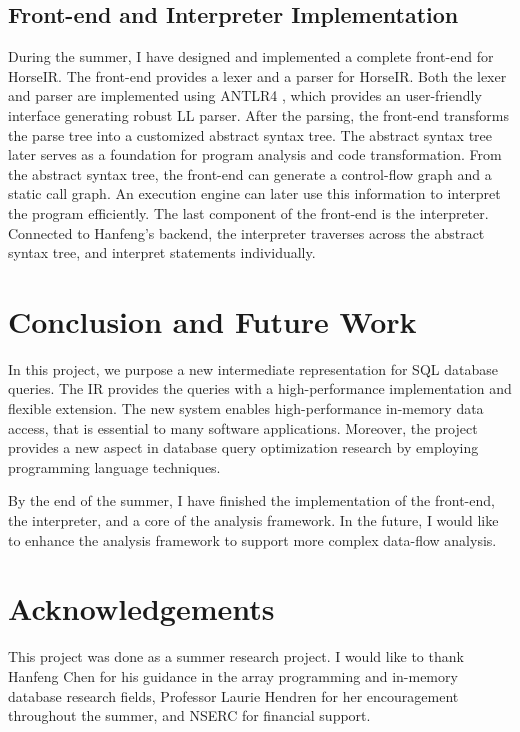 \documentclass[sigplan]{acmart}
\begin{document}
\subsection*{Front-end and Interpreter Implementation}
During the summer, I have designed and implemented a complete front-end for
HorseIR. The front-end provides a lexer and a parser for HorseIR. Both the
lexer and parser are implemented using ANTLR4\cite{ANTLRHome} , which provides
an user-friendly interface generating robust LL parser. After the parsing, the
front-end transforms the parse tree into a customized abstract syntax tree.
The abstract syntax tree later serves as a foundation for program analysis and
code transformation. From the abstract syntax tree, the front-end can generate
a control-flow graph and a static call graph. An execution engine can later
use this information to interpret the program efficiently. The last component
of the front-end is the interpreter. Connected to Hanfeng's backend, the
interpreter traverses across the abstract syntax tree, and interpret statements
individually.

\section{Conclusion and Future Work}

In this project, we purpose a new intermediate representation for SQL database
queries. The IR provides the queries with a high-performance implementation
and flexible extension. The new system enables high-performance in-memory data
access, that is essential to many software applications. Moreover, the project
provides a new aspect in database query optimization research by employing
programming language techniques. 

By the end of the summer, I have finished the implementation of the front-end,
the interpreter, and a core of the analysis framework. In the future, I would
like to enhance the analysis framework to support more complex data-flow
analysis. 

\section*{Acknowledgements}
This project was done as a summer research project. I would like to
thank Hanfeng Chen for his guidance in the array programming and in-memory
database research fields, Professor Laurie Hendren for her encouragement
throughout the summer, and NSERC for financial support.



\end{document}
